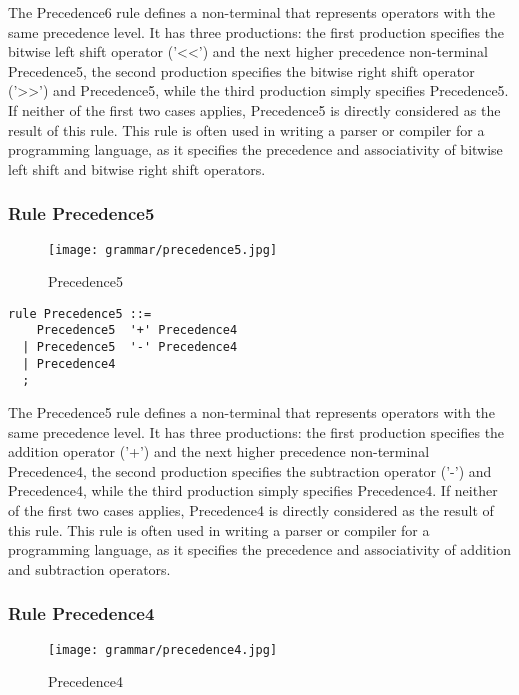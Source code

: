 The Precedence6 rule defines a non-terminal that represents operators with the same precedence level. It has three productions: the first production specifies the bitwise left shift operator ('<<') and the next higher precedence non-terminal Precedence5, the second production specifies the bitwise right shift operator ('>>') and Precedence5, while the third production simply specifies Precedence5. If neither of the first two cases applies, Precedence5 is directly considered as the result of this rule. This rule is often used in writing a parser or compiler for a programming language, as it specifies the precedence and associativity of bitwise left shift and bitwise right shift operators.

\subsubsection*{Rule Precedence5}

\begin{figure}[!ht]
\centering
\texttt{[image: grammar/precedence5.jpg]}
\caption{Precedence5}
\end{figure}

\begin{lstlisting}
rule Precedence5 ::=
    Precedence5  '+' Precedence4 
  | Precedence5  '-' Precedence4 
  | Precedence4 
  ;
\end{lstlisting}

The Precedence5 rule defines a non-terminal that represents operators with the same precedence level. It has three productions: the first production specifies the addition operator ('+') and the next higher precedence non-terminal Precedence4, the second production specifies the subtraction operator ('-') and Precedence4, while the third production simply specifies Precedence4. If neither of the first two cases applies, Precedence4 is directly considered as the result of this rule. This rule is often used in writing a parser or compiler for a programming language, as it specifies the precedence and associativity of addition and subtraction operators.

\subsubsection*{Rule Precedence4}

\begin{figure}[!ht]
\centering
\texttt{[image: grammar/precedence4.jpg]}
\caption{Precedence4}
\end{figure}

